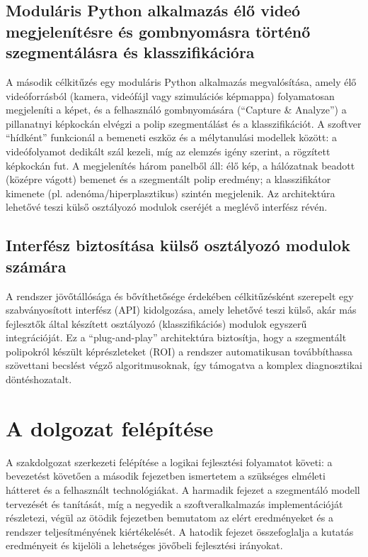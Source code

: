\documentclass[12pt, a4paper]{report}
\begin{document}
\subsection{Moduláris Python alkalmazás élő videó megjelenítésre és gombnyomásra történő szegmentálásra és klasszifikációra}
A második célkitűzés egy moduláris Python alkalmazás megvalósítása, amely élő videóforrásból (kamera, videófájl vagy szimulációs képmappa) folyamatosan megjeleníti a képet, és a felhasználó gombnyomására (``Capture \& Analyze'') a pillanatnyi képkockán elvégzi a polip szegmentálást és a klasszifikációt. A szoftver ``hídként'' funkcionál a bemeneti eszköz és a mélytanulási modellek között: a videófolyamot dedikált szál kezeli, míg az elemzés igény szerint, a rögzített képkockán fut. A megjelenítés három panelből áll: élő kép, a hálózatnak beadott (középre vágott) bemenet és a szegmentált polip eredmény; a klasszifikátor kimenete (pl. adenóma/hiperplasztikus) szintén megjelenik. Az architektúra lehetővé teszi külső osztályozó modulok cseréjét a meglévő interfész révén.

\subsection{Interfész biztosítása külső osztályozó modulok számára}
A rendszer jövőtállósága és bővíthetősége érdekében célkitűzésként szerepelt egy szabványosított interfész (API) kidolgozása, amely lehetővé teszi külső, akár más fejlesztők által készített osztályozó (klasszifikációs) modulok egyszerű integrációját. Ez a ``plug-and-play'' architektúra biztosítja, hogy a szegmentált polipokról készült képrészleteket (ROI) a rendszer automatikusan továbbíthassa szövettani becslést végző algoritmusoknak, így támogatva a komplex diagnosztikai döntéshozatalt.

\section{A dolgozat felépítése}
A szakdolgozat szerkezeti felépítése a logikai fejlesztési folyamatot követi: a bevezetést követően a második fejezetben ismertetem a szükséges elméleti hátteret és a felhasznált technológiákat. A harmadik fejezet a szegmentáló modell tervezését és tanítását, míg a negyedik a szoftveralkalmazás implementációját részletezi, végül az ötödik fejezetben bemutatom az elért eredményeket és a rendszer teljesítményének kiértékelését. A hatodik fejezet összefoglalja a kutatás eredményeit és kijelöli a lehetséges jövőbeli fejlesztési irányokat.
\end{document}
